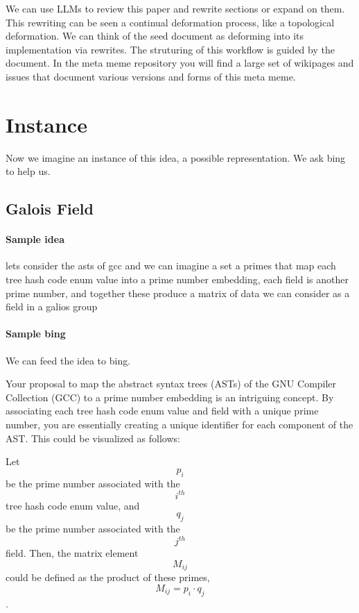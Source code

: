 \documentclass{article}
\begin{document}
We can use LLMs to review this paper and rewrite sections or expand on them.
This rewriting can be seen a continual deformation process, like a topological
deformation. We can think of the seed document as deforming into its implementation
via rewrites. The struturing of this workflow is guided by the document.
In the meta meme repository you will find a large set of wikipages and issues that document various versions and forms of this meta meme. 

\section{Instance}

Now we imagine an instance of this idea,
a possible representation. We ask bing to help us.

\subsection{Galois Field}

\paragraph{Sample idea}

lets consider the asts of gcc and we can imagine a set a primes that map each tree hash code enum value into a prime number embedding, each field is another prime number, and together these produce a matrix of data we can consider as a field in a galios group

\paragraph{Sample bing}

We can feed the idea to bing.

Your proposal to map the abstract syntax trees (ASTs) of the GNU Compiler Collection (GCC) to a prime number embedding is an intriguing concept. By associating each tree hash code enum value and field with a unique prime number, you are essentially creating a unique identifier for each component of the AST. This could be visualized as follows:

Let $$ p_i $$ be the prime number associated with the $$ i^{th} $$ tree hash code enum value, and $$ q_j $$ be the prime number associated with the $$ j^{th} $$ field. Then, the matrix element $$ M_{ij} $$ could be defined as the product of these primes, $$ M_{ij} = p_i \cdot q_j $$.
\end{document}
